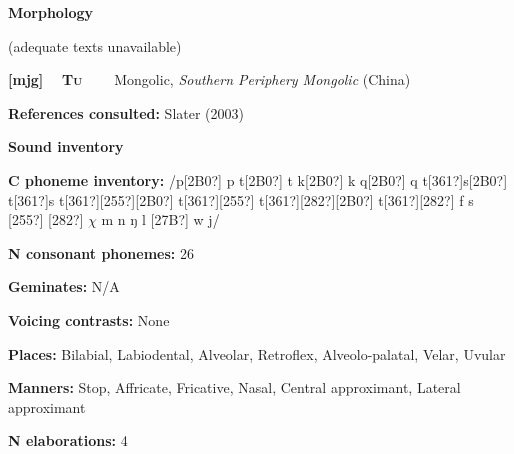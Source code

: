\begin{styleBody}
\textbf{Morphology}
\end{styleBody}

\begin{styleBody}
(adequate texts unavailable)
\end{styleBody}

\clearpage\begin{styleBody}
\textbf{[mjg] }\ \ \textbf{\textsc{Tu}}\textbf{\ \ \ \ }Mongolic, \textit{Southern Periphery Mongolic} (China)
\end{styleBody}

\begin{styleBody}
\textbf{References consulted: }Slater (2003)
\end{styleBody}

\begin{styleBody}
\textbf{Sound inventory}
\end{styleBody}

\begin{styleBody}
\textbf{C phoneme inventory:} /p[2B0?] p t[2B0?] t k[2B0?] k q[2B0?] q t[361?]s[2B0?] t[361?]s t[361?][255?][2B0?] t[361?][255?] t[361?][282?][2B0?] t[361?][282?] f s [255?] [282?] $\chi $ m n ŋ l [27B?] w j/
\end{styleBody}

\begin{styleBody}
\textbf{N consonant phonemes:} 26
\end{styleBody}

\begin{styleBody}
\textbf{Geminates:} N/A
\end{styleBody}

\begin{styleBody}
\textbf{Voicing contrasts:} None
\end{styleBody}

\begin{styleBody}
\textbf{Places:} Bilabial, Labiodental, Alveolar, Retroflex, Alveolo-palatal, Velar, Uvular
\end{styleBody}

\begin{styleBody}
\textbf{Manners:} Stop, Affricate, Fricative, Nasal, Central approximant, Lateral approximant
\end{styleBody}

\begin{styleBody}
\textbf{N elaborations:} 4
\end{styleBody}

